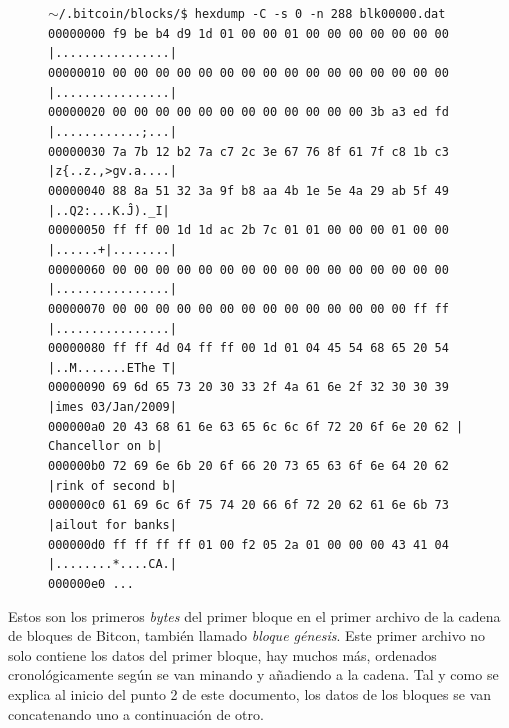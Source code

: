 \documentclass{article}
\begin{document}
    \begin{figure}[H]
    \scriptsize{\texttt{$\sim$/.bitcoin/blocks/\$ hexdump -C -s 0 -n 288 blk00000.dat \\
00000000  f9 be b4 d9 1d 01 00 00  01 00 00 00 00 00 00 00  |................| \\
00000010  00 00 00 00 00 00 00 00  00 00 00 00 00 00 00 00  |................| \\
00000020  00 00 00 00 00 00 00 00  00 00 00 00 3b a3 ed fd  |............;...| \\
00000030  7a 7b 12 b2 7a c7 2c 3e  67 76 8f 61 7f c8 1b c3  |z\{..z.,>gv.a....| \\
00000040  88 8a 51 32 3a 9f b8 aa  4b 1e 5e 4a 29 ab 5f 49  |..Q2:...K.\^J).\_I| \\
00000050  ff ff 00 1d 1d ac 2b 7c  01 01 00 00 00 01 00 00  |......+|........| \\
00000060  00 00 00 00 00 00 00 00  00 00 00 00 00 00 00 00  |................| \\
00000070  00 00 00 00 00 00 00 00  00 00 00 00 00 00 ff ff  |................| \\
00000080  ff ff 4d 04 ff ff 00 1d  01 04 45 54 68 65 20 54  |..M.......EThe T| \\
00000090  69 6d 65 73 20 30 33 2f  4a 61 6e 2f 32 30 30 39  |imes 03/Jan/2009| \\
000000a0  20 43 68 61 6e 63 65 6c  6c 6f 72 20 6f 6e 20 62  | Chancellor on b| \\
000000b0  72 69 6e 6b 20 6f 66 20  73 65 63 6f 6e 64 20 62  |rink of second b| \\
000000c0  61 69 6c 6f 75 74 20 66  6f 72 20 62 61 6e 6b 73  |ailout for banks| \\
000000d0  ff ff ff ff 01 00 f2 05  2a 01 00 00 00 43 41 04  |........*....CA.| \\
000000e0  ...}
    }
    \end{figure}
    
    Estos son los primeros \textit{bytes} del primer bloque en el primer archivo de la cadena de bloques de Bitcon, también llamado \textit{bloque génesis}. Este primer archivo no solo contiene los datos del primer bloque, hay muchos más, ordenados cronológicamente según se van minando y añadiendo a la cadena. Tal y como se explica al inicio del punto 2 de este documento, los datos de los bloques se van concatenando uno a continuación de otro.
    
    \vspace{3mm}
    
\end{document}
